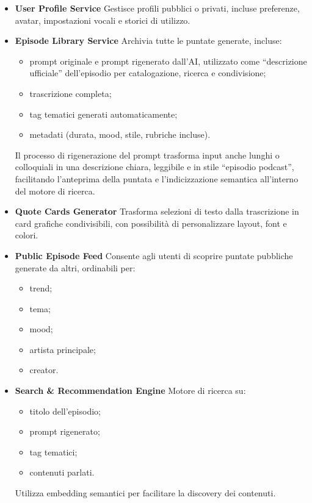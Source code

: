 \documentclass[11pt,a4paper]{article}
\begin{document}
\begin{itemize}
    \item \textbf{User Profile Service}  
    Gestisce profili pubblici o privati, incluse preferenze, avatar, impostazioni vocali e storici di utilizzo.

    \item \textbf{Episode Library Service}  
    Archivia tutte le puntate generate, incluse:
    \begin{itemize}
        \item prompt originale e prompt rigenerato dall’AI, utilizzato come “descrizione ufficiale” dell’episodio per catalogazione, ricerca e condivisione;
        \item trascrizione completa;
        \item tag tematici generati automaticamente;
        \item metadati (durata, mood, stile, rubriche incluse).
    \end{itemize}

    Il processo di rigenerazione del prompt trasforma input anche lunghi o colloquiali in una descrizione chiara, leggibile e in stile “episodio podcast”, facilitando l’anteprima della puntata e l’indicizzazione semantica all’interno del motore di ricerca.

    \item \textbf{Quote Cards Generator}  
    Trasforma selezioni di testo dalla trascrizione in card grafiche condivisibili, con possibilità di personalizzare layout, font e colori.

    \item \textbf{Public Episode Feed}  
    Consente agli utenti di scoprire puntate pubbliche generate da altri, ordinabili per:
    \begin{itemize}
        \item trend;
        \item tema;
        \item mood;
        \item artista principale;
        \item creator.
    \end{itemize}

    \item \textbf{Search \& Recommendation Engine}  
    Motore di ricerca su:
    \begin{itemize}
        \item titolo dell’episodio;
        \item prompt rigenerato;
        \item tag tematici;
        \item contenuti parlati.
    \end{itemize}
    Utilizza embedding semantici per facilitare la discovery dei contenuti.
\end{itemize}
\end{document}
